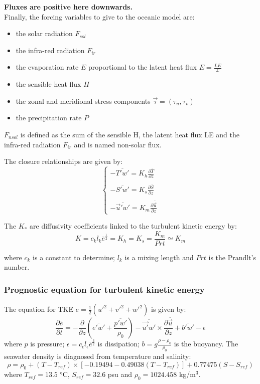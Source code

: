 \textbf{Fluxes are positive here downwards. }\\

Finally, the forcing variables to give to the oceanic model are:
\begin{itemize}
\item the solar radiation $F_{sol}$
\item the infra-red radiation $F_{ir}$
\item the evaporation rate $E$ proportional to the latent heat flux $E=\frac{LE}{\mathcal{L}}$
\item the sensible heat flux $H$
\item the zonal and meridional stress components $\vec{\tau}=(\tau_{u},\tau_{v})$
\item the precipitation rate $P$
\end{itemize}
$F_{nsol}$ is defined as the sum of the sensible H, the latent heat flux LE and the infra-red radiation $F_{ir}$ and is named non-solar flux. 


The closure relationships are given by: 
\begin{equation}
\left\{
\begin{array}{l}
-\overline{T'w'}=K_{h}\frac{\partial \overline{T}}{\partial z}\\
\\
-\overline{S'w'}=K_{s}\frac{\partial \overline{S}}{\partial z}\\
\\
-\overline{\vec{u}'w'}=K_{m}\frac{\partial \overline{\vec{u}}}{\partial z}
\end{array}
\right.
\end{equation}

The $K_{*}$ are diffusivity coefficients linked to the turbulent kinetic energy by: 
\begin{equation}
K=c_{k}l_{k}\overline{e}^{\frac{1}{2}}=K_{h}=K_{s}=\frac{K_{m}}{Prt}\simeq K_{m}
\end{equation}

\noindent where $c_{k}$ is a constant to determine; $l_{k}$ is a mixing length and $Prt$ is the Prandlt's number. 

\subsubsection{Prognostic equation for turbulent kinetic energy}
The equation for TKE $e=\frac{1}{2}(u'^{2}+v'^{2}+w'^{2})$ is given by:
\begin{equation}
\frac{\partial \overline{e}}{\partial t}=-\frac{\partial}{\partial z}\left(\overline{e'w'}+\frac{\overline{p'w'}}{\rho_{0}}\right)-\overline{\vec{u'}w'}\times \frac{\partial \overline{\vec{u}}}{\partial z}+\overline{b'w'}-\epsilon
\end{equation}
\noindent where $p$ is pressure; $\epsilon=c_{\epsilon}l_{\epsilon}\overline{e}^{\frac{3}{2}}$ is dissipation; $b=g\frac{\rho-\rho_{0}}{\rho_{0}}$ is the buoyancy. The seawater density is diagnosed from temperature and salinity:
$$\rho=\rho_{0}+(T-T_{ref})\times[-0.19494-0.49038(T-T_{ref})]+0.77475(S-S_{ref})$$
where $T_{ref}=13.5$ °C, $S_{ref}=32.6$ psu and $\rho_{0}=1024.458$ kg/m$^{3}$. 

